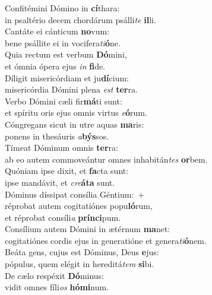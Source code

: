 \evenverse Confitémini Dómino in \textbf{cí}thara:~\*\\
\evenverse in psaltério decem chordárum psálli\textit{te} \textbf{il}li.\\
\oddverse Cantáte ei cánticum \textbf{no}vum:~\*\\
\oddverse bene psállite ei in vocifera\textit{ti}\textbf{ó}ne.\\
\evenverse Quia rectum est verbum \textbf{Dó}mini,~\*\\
\evenverse et ómnia ópera ejus \textit{in} \textbf{fi}de.\\
\oddverse Díligit misericórdiam et ju\textbf{dí}cium:~\*\\
\oddverse misericórdia Dómini plena \textit{est} \textbf{ter}ra.\\
\evenverse Verbo Dómini cæli fir\textbf{má}ti sunt:~\*\\
\evenverse et spíritu oris ejus omnis virtus \textit{e}\textbf{ó}rum.\\
\oddverse Cóngregans sicut in utre aquas \textbf{ma}ris:~\*\\
\oddverse ponens in thesáuris \textit{a}\textbf{býs}sos.\\
\evenverse Tímeat Dóminum omnis \textbf{ter}ra:~\*\\
\evenverse ab eo autem commoveántur omnes inhabitán\textit{tes} \textbf{or}bem.\\
\oddverse Quóniam ipse dixit, et \textbf{fa}cta sunt:~\*\\
\oddverse ipse mandávit, et \textit{cre}\textbf{á}\textbf{ta} sunt.\\
\evenverse Dóminus díssipat consília Géntium:~+\\
\evenverse  réprobat autem cogitatiónes popu\textbf{ló}rum,~\*\\
\evenverse et réprobat consíli\textit{a} \textbf{prín}\textbf{ci}pum.\\
\oddverse Consílium autem Dómini in ætérnum \textbf{ma}net:~\*\\
\oddverse cogitatiónes cordis ejus in generatióne et genera\textit{ti}\textbf{ó}nem.\\
\evenverse Beáta gens, cujus est Dóminus, Deus \textbf{e}jus:~\*\\
\evenverse pópulus, quem elégit in hereditá\textit{tem} \textbf{si}bi.\\
\oddverse De cælo respéxit \textbf{Dó}minus:~\*\\
\oddverse vidit omnes fíli\textit{os} \textbf{hó}\textbf{mi}num.\\
